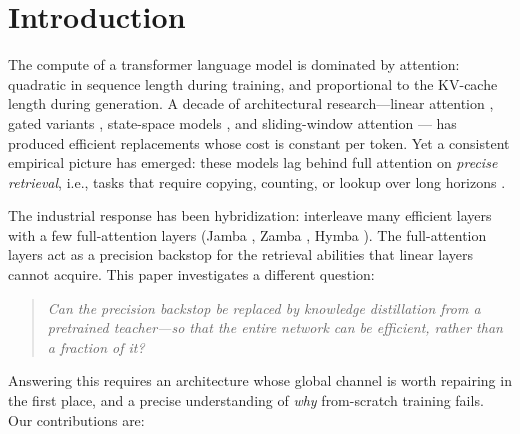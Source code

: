 \documentclass[11pt]{article}
\begin{document}
\section{Introduction}\label{sec:intro}

The compute of a transformer language model is dominated by attention: quadratic in
sequence length during training, and proportional to the KV-cache length during
generation. A decade of architectural research---linear attention
\cite{katharopoulos2020}, gated variants \cite{yang2023gla,peng2023rwkv}, state-space
models \cite{gu2023mamba}, and sliding-window attention \cite{beltagy2020longformer}---
has produced efficient replacements whose cost is constant per token. Yet a consistent
empirical picture has emerged: these models lag behind full attention on \emph{precise
retrieval}, i.e., tasks that require copying, counting, or lookup over long horizons
\cite{waleffe2024jamba}.

The industrial response has been hybridization: interleave many efficient layers with a
few full-attention layers (Jamba \cite{waleffe2024jamba}, Zamba \cite{glorioso2024zamba},
Hymba \cite{wang2024hymba}). The full-attention layers act as a precision backstop for
the retrieval abilities that linear layers cannot acquire. This paper investigates a
different question:

\begin{quote}\itshape
Can the precision backstop be replaced by knowledge distillation from a pretrained
teacher---so that the \emph{entire} network can be efficient, rather than a fraction of it?
\end{quote}

Answering this requires an architecture whose global channel is worth repairing in the
first place, and a precise understanding of \emph{why} from-scratch training fails. Our
contributions are:
\end{document}
